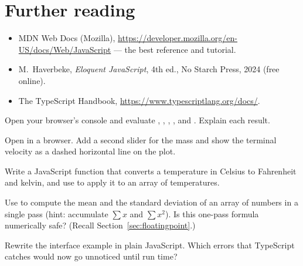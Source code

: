 \section{Further reading}
\begin{itemize}
\item MDN Web Docs (Mozilla), \url{https://developer.mozilla.org/en-US/docs/Web/JavaScript} ---
  the best reference and tutorial.
\item M.~Haverbeke, \emph{Eloquent JavaScript}, 4th ed., No Starch Press, 2024 (free online).
\item The TypeScript Handbook, \url{https://www.typescriptlang.org/docs/}.
\end{itemize}

\begin{exercises}
\item Open your browser's console and evaluate , ,
  , \code{[] + []},  and . Explain
  each result.
\item Open  in a browser. Add a second slider for the mass and show the
  terminal velocity as a dashed horizontal line on the plot.
\item Write a JavaScript function that converts a temperature in Celsius to Fahrenheit and
  kelvin, and use  to apply it to an array of temperatures.
\item Use  to compute the mean and the standard deviation of an array of
  numbers in a single pass (hint: accumulate $\sum x$ and $\sum x^2$). Is this one-pass
  formula numerically safe? (Recall Section~\ref{sec:floatingpoint}.)
\item Rewrite the  interface example in plain JavaScript. Which errors that
  TypeScript catches would now go unnoticed until run time?
\end{exercises}
